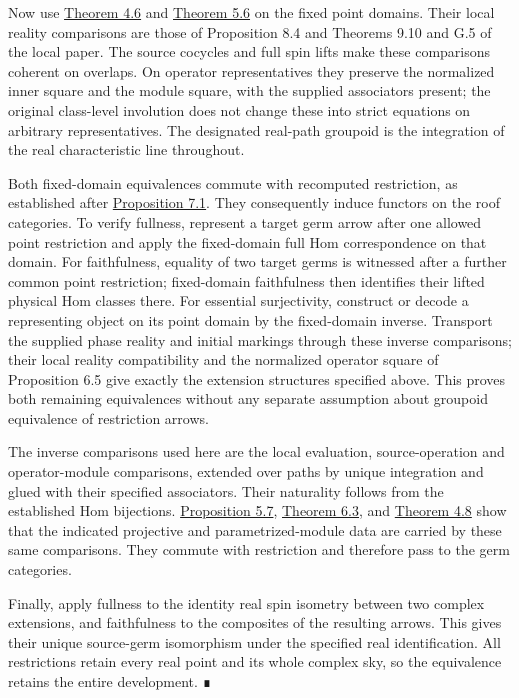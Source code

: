 \documentclass[
  english,
  11pt,
  reqno]{amsart}
\begin{document}
Now use \hyperref[thm:operator-monodromy-equivalence]{Theorem 4.6} and
\hyperref[thm:original-source-atlas-operator-equivalence]{Theorem 5.6}
on the fixed point domains. Their local reality comparisons are those of
Proposition 8.4 and Theorems 9.10 and G.5 of the local paper. The source
cocycles and full spin lifts make these comparisons coherent on
overlaps. On operator representatives they preserve the normalized inner
square and the module square, with the supplied associators present; the
original class-level involution does not change these into strict
equations on arbitrary representatives. The designated real-path
groupoid is the integration of the real characteristic line throughout.

Both fixed-domain equivalences commute with recomputed restriction, as
established after
\hyperref[prop:recomputed-monodromy-restriction]{Proposition 7.1}. They
consequently induce functors on the roof categories. To verify fullness,
represent a target germ arrow after one allowed point restriction and
apply the fixed-domain full Hom correspondence on that domain. For
faithfulness, equality of two target germs is witnessed after a further
common point restriction; fixed-domain faithfulness then identifies
their lifted physical Hom classes there. For essential surjectivity,
construct or decode a representing object on its point domain by the
fixed-domain inverse. Transport the supplied phase reality and initial
markings through these inverse comparisons; their local reality
compatibility and the normalized operator square of Proposition 6.5 give
exactly the extension structures specified above. This proves both
remaining equivalences without any separate assumption about groupoid
equivalence of restriction arrows.

The inverse comparisons used here are the local evaluation,
source-operation and operator-module comparisons, extended over paths by
unique integration and glued with their specified associators. Their
naturality follows from the established Hom bijections.
\hyperref[prop:source-atlas-complete-diagram]{Proposition 5.7},
\hyperref[thm:global-projective-diagram-naturality]{Theorem 6.3}, and
\hyperref[thm:global-parametrized-point-module-family]{Theorem 4.8} show
that the indicated projective and parametrized-module data are carried
by these same comparisons. They commute with restriction and therefore
pass to the germ categories.

Finally, apply fullness to the identity real spin isometry between two
complex extensions, and faithfulness to the composites of the resulting
arrows. This gives their unique source-germ isomorphism under the
specified real identification. All restrictions retain every real point
and its whole complex sky, so the equivalence retains the entire
development. ∎
\end{document}
